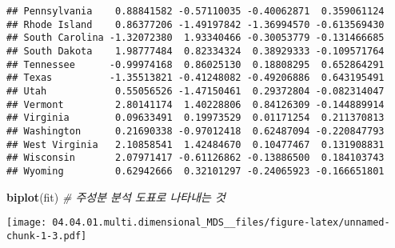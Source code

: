 \documentclass[]{article}
\newenvironment{Shaded}{\begin{snugshade}}{\end{snugshade}}
\newcommand{\KeywordTok}[1]{\textcolor[rgb]{0.13,0.29,0.53}{\textbf{#1}}}
\newcommand{\CommentTok}[1]{\textcolor[rgb]{0.56,0.35,0.01}{\textit{#1}}}
\newcommand{\NormalTok}[1]{#1}
\begin{document}
\begin{verbatim}
## Pennsylvania    0.88841582 -0.57110035 -0.40062871  0.359061124
## Rhode Island    0.86377206 -1.49197842 -1.36994570 -0.613569430
## South Carolina -1.32072380  1.93340466 -0.30053779 -0.131466685
## South Dakota    1.98777484  0.82334324  0.38929333 -0.109571764
## Tennessee      -0.99974168  0.86025130  0.18808295  0.652864291
## Texas          -1.35513821 -0.41248082 -0.49206886  0.643195491
## Utah            0.55056526 -1.47150461  0.29372804 -0.082314047
## Vermont         2.80141174  1.40228806  0.84126309 -0.144889914
## Virginia        0.09633491  0.19973529  0.01171254  0.211370813
## Washington      0.21690338 -0.97012418  0.62487094 -0.220847793
## West Virginia   2.10858541  1.42484670  0.10477467  0.131908831
## Wisconsin       2.07971417 -0.61126862 -0.13886500  0.184103743
## Wyoming         0.62942666  0.32101297 -0.24065923 -0.166651801
\end{verbatim}

\begin{Shaded}
\begin{Highlighting}[]
\KeywordTok{biplot}\NormalTok{(fit) }\CommentTok{# 주성분 분석 도표로 나타내는 것}
\end{Highlighting}
\end{Shaded}

\texttt{[image: 04.04.01.multi.dimensional\_MDS\_\_files/figure-latex/unnamed-chunk-1-3.pdf]}
\end{document}
